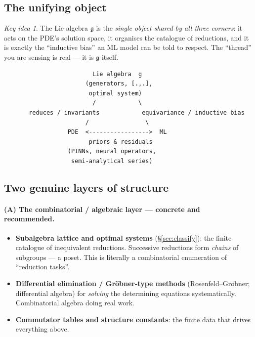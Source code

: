 \documentclass[11pt]{article}
\theoremstyle{definition}
\theoremstyle{remark}
\newtheorem*{keyidea}{Key idea}
\newcommand{\g}{\mathfrak{g}}
\begin{document}
\subsection{The unifying object}

\begin{keyidea}
The Lie algebra $\g$ is the \emph{single object shared by all three corners}: it acts on the PDE's
solution space, it organises the catalogue of reductions, and it is exactly the ``inductive bias'' an ML
model can be told to respect. The ``thread'' you are sensing is real --- it is $\g$ itself.
\end{keyidea}

\begin{center}
\begin{verbatim}
                         Lie algebra  g
                       (generators, [.,.],
                        optimal system)
                         /            \
       reduces / invariants            equivariance / inductive bias
                       /                \
                  PDE  <----------------->  ML
                        priors & residuals
                  (PINNs, neural operators,
                   semi-analytical series)
\end{verbatim}
\end{center}

\subsection{Two genuine layers of structure}

\paragraph{(A) The combinatorial / algebraic layer --- concrete and recommended.}
\begin{itemize}[nosep]
  \item \textbf{Subalgebra lattice and optimal systems} (\S\ref{sec:classify}): the finite catalogue of
        inequivalent reductions. Successive reductions form \emph{chains} of subgroups --- a poset. This is
        literally a combinatorial enumeration of ``reduction tasks''.
  \item \textbf{Differential elimination / Gröbner-type methods} (Rosenfeld--Gr\"obner; differential
        algebra) for \emph{solving} the determining equations systematically. Combinatorial algebra doing
        real work.
  \item \textbf{Commutator tables and structure constants}: the finite data that drives everything above.
\end{itemize}
\end{document}
